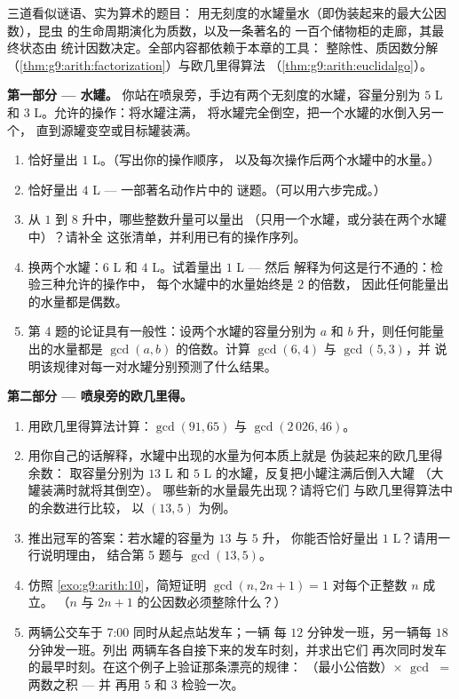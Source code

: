 \begin{problem}
\label{pb:g9:arith:1}
三道看似谜语、实为算术的题目：
用无刻度的水罐量水（即伪装起来的最大公因数），昆虫
的生命周期演化为质数，以及一条著名的
一百个储物柜的走廊，其最终状态由
统计因数决定。全部内容都依赖于本章的工具：
整除性、质因数分解
（\cref{thm:g9:arith:factorization}）与欧几里得算法
（\cref{thm:g9:arith:euclidalgo}）。

\medskip
\noindent\textbf{第一部分 --- 水罐。}
你站在喷泉旁，手边有两个无刻度的水罐，容量分别为 $5$ L 和
$3$ L。允许的操作：将水罐注满，
将水罐完全倒空，把一个水罐的水倒入另一个，
直到源罐变空或目标罐装满。
\begin{enumerate}
  \item 恰好量出 $1$ L。（写出你的操作顺序，
        以及每次操作后两个水罐中的水量。）
  \item 恰好量出 $4$ L --- 一部著名动作片中的
        谜题。（可以用六步完成。）
  \item 从 $1$ 到 $8$ 升中，哪些整数升量可以量出
        （只用一个水罐，或分装在两个水罐中）？请补全
        这张清单，并利用已有的操作序列。
  \item 换两个水罐：$6$ L 和 $4$ L。试着量出 $1$ L --- 然后
        解释为何这是行不通的：检验三种允许的操作中，
        每个水罐中的水量始终是 $2$ 的倍数，
        因此任何能量出的水量都是偶数。
  \item 第 4 题的论证具有一般性：设两个水罐的容量分别为 $a$
        和 $b$ 升，则任何能量出的水量都是
        $\gcd(a, b)$ 的倍数。计算 $\gcd(6, 4)$ 与 $\gcd(5, 3)$，并
        说明该规律对每一对水罐分别预测了什么结果。
\end{enumerate}

\medskip
\noindent\textbf{第二部分 --- 喷泉旁的欧几里得。}
\begin{enumerate}[resume]
  \item 用欧几里得算法计算：$\gcd(91, 65)$ 与
        $\gcd(2\,026, 46)$。
  \item 用你自己的话解释，水罐中出现的水量为何本质上就是
        伪装起来的欧几里得余数：
        取容量分别为 $13$ L 和 $5$ L 的水罐，反复把小罐注满后倒入大罐
        （大罐装满时就将其倒空）。
        哪些新的水量最先出现？请将它们
        与欧几里得算法中的余数进行比较，
        以 $(13, 5)$ 为例。
  \item 推出冠军的答案：若水罐的容量为 $13$ 与 $5$ 升，
        你能否恰好量出 $1$ L？请用一行说明理由，
        结合第 5 题与 $\gcd(13, 5)$。
  \item 仿照
        \cref{exo:g9:arith:10}，简短证明 $\gcd(n, 2n + 1) = 1$
        对每个正整数 $n$ 成立。
        （$n$ 与 $2n + 1$ 的公因数必须整除什么？）
  \item 两辆公交车于 7:00 同时从起点站发车；一辆
        每 $12$ 分钟发一班，另一辆每 $18$ 分钟发一班。列出
        两辆车各自接下来的发车时刻，并求出它们
        再次同时发车的最早时刻。在这个例子上验证那条漂亮的规律：
        （最小公倍数）$\times$
        $\gcd$ $=$ 两数之积 --- 并
        再用 $5$ 和 $3$ 检验一次。
\end{enumerate}


\end{problem}

